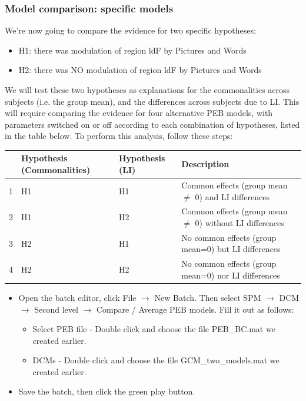 \documentclass{article}
\begin{document}
\subsubsection{Model comparison: specific models} \label{GUI_specificDCMs}

We're now going to compare the evidence for two specific hypotheses:

\begin{itemize}
    \item H1: there was modulation of region ldF by Pictures and Words
    \item H2: there was NO modulation of region ldF by Pictures and Words
\end{itemize}

We will test these two hypotheses as explanations for the commonalities across subjects (i.e. the group mean), and the differences across subjects due to LI. This will require comparing the evidence for four alternative PEB models, with parameters switched on or off according to each combination of hypotheses, listed in the table below. To perform this analysis, follow these steps:

\begin{table}[]
\begin{tabular}{|l|l|l|p{6cm}|}
\hline
 & \textbf{Hypothesis (Commonalities)} & \textbf{Hypothesis (LI)} & \textbf{Description}                             \\ \hline
1              & H1                     & H1          & Common effects (group mean $\ne$ 0) and LI differences                                   \\ \hline
2              & H1                     & H2          & Common effects (group mean $\ne$ 0) without LI differences \\ \hline
3              & H2                     & H1          & No common effects (group mean=0) but LI differences        \\ \hline
4              & H2                     & H2          & No common effects (group mean=0) nor LI differences         \\ \hline
\end{tabular}
\end{table}

\begin{itemize}
    \item Open the batch editor, click File $\rightarrow$ New Batch. Then select SPM $\rightarrow$ DCM $\rightarrow$ Second level $\rightarrow$ Compare / Average PEB models. Fill it out as follows:
    \begin{itemize}
        \item Select PEB file - Double click and choose the file PEB\_BC.mat we created earlier.
        \item DCMs - Double click and choose the file GCM\_two\_models.mat we created earlier.
    \end{itemize}
    \item Save the batch, then click the green play button.
\end{itemize}
\end{document}

